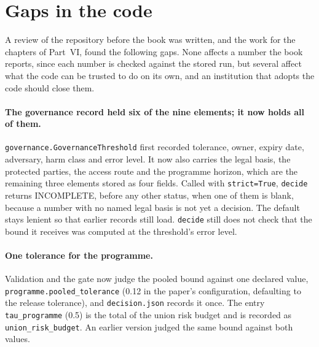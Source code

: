 \section{Gaps in the code}

A review of the repository before the book was written, and the work for the chapters
of Part~VI, found the following gaps. None affects a number the book reports, since
each number is checked against the stored run, but several affect what the code can
be trusted to do on its own, and an institution that adopts the code should close
them.

\paragraph{The governance record held six of the nine elements; it now holds all of them.}
\texttt{governance.GovernanceThreshold} first recorded tolerance, owner, expiry date,
adversary, harm class and error level. It now also carries the legal basis, the protected
parties, the access route and the programme horizon, which are the remaining three
elements stored as four fields. Called with \texttt{strict=True}, \texttt{decide} returns
INCOMPLETE, before any other status, when one of them is blank, because a number with no
named legal basis is not yet a decision. The default stays lenient so that earlier records
still load. \texttt{decide} still does not check that the bound it receives was computed
at the threshold's error level.

\paragraph{One tolerance for the programme.} Validation and the gate now judge the pooled
bound against one declared value, \texttt{programme.\allowbreak{}pooled\_\allowbreak{}tolerance}
(0.12 in the paper's configuration, defaulting to the release tolerance), and
\texttt{decision.\allowbreak{}json} records it once. The entry
\texttt{tau\_\allowbreak{}programme} (0.5) is the total of the union risk budget and is recorded
as \texttt{union\_\allowbreak{}risk\_\allowbreak{}budget}. An earlier version judged the same bound
against both values. %

